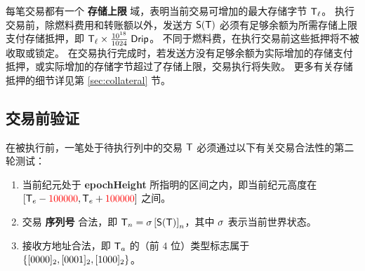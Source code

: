 每笔交易都有一个 \textbf{存储上限} 域，表明当前交易可增加的最大存储字节 $\textsf{T}_\ell$。
执行交易前，除燃料费用和转账额以外，发送方 $\mathsf{S}{\left({\textsf{T}} \right)}$ 必须有足够余额为所需存储上限支付存储抵押，即 $\textsf{T}_\ell\times\frac{10^{18}}{1024}\;{\sf Drip}$。
不同于燃料费，在执行交易前这些抵押将不被收取或锁定。
在交易执行完成时，若发送方没有足够余额为实际增加的存储支付抵押，或实际增加的存储字节超过了存储上限，交易执行将失败。
更多有关存储抵押的细节详见第 \ref{sec:collateral} 节。

\subsection{交易前验证}
\label{sec:tx validate}

在被执行前，一笔处于待执行列中的交易 $\textsf{T}$ 必须通过以下有关交易合法性的第二轮测试：
\begin{enumerate}[nosep]
	\item 当前纪元处于 \textbf{epochHeight} 所指明的区间之内，即当前纪元高度在 $[\textsf{T}_e - {\color{red}100000}, \textsf{T}_e + {\color{red}100000}]$ 之间。
	
	\item 交易 \textbf{序列号} 合法，即 $\textsf{T}_n = \mathbf{\sigma}\left[\mathsf{S}{\left({\textsf{T}} \right)}\right]_n$，其中 $\mathbf{\sigma}$ 表示当前世界状态。

	\item 接收方地址合法，即 $\textsf{T}_a$ 的（前 $4$ 位）类型标志属于 ${\left \{{[0000]_2,[0001]_2,[1000]_2} \right \}}$。
\end{enumerate}

